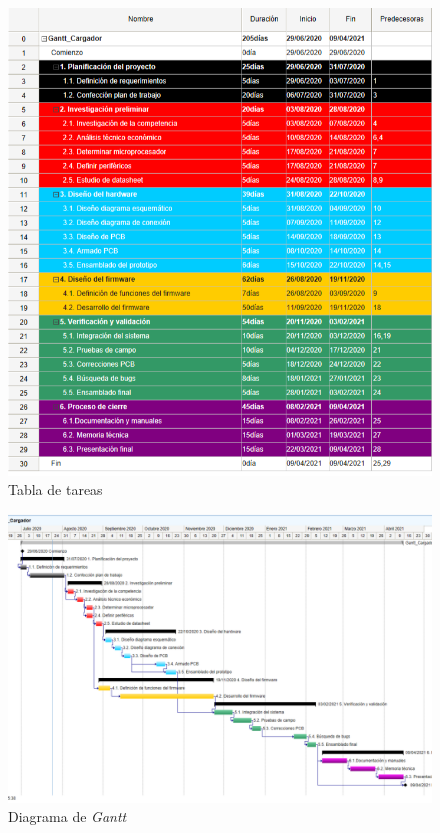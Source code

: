 \documentclass[11pt]{charter}
\begin{document}
\begin{figure}[H]
\centering 
\includegraphics[width=1\textwidth]{./Figuras/Gantt_tabla.png}
\caption{Tabla de tareas}
\label{fig:Tabla Gantt}
\end{figure}

\begin{figure}[H]
\centering 
\includegraphics[angle=90, width=1\textwidth]{./Figuras/Gantt_diag.png}
\caption{Diagrama de \textit{Gantt}}
\label{fig:Diagrama Gantt}
\end{figure}
\end{document}
